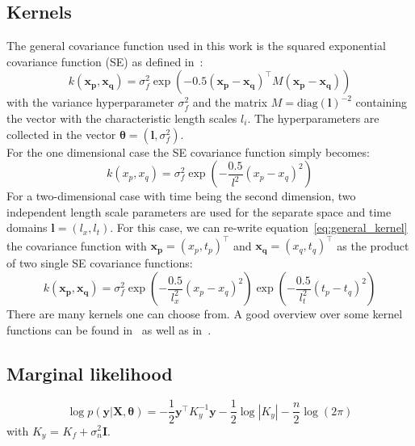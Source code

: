 \documentclass{article}
\begin{document}
\subsection{Kernels}
The general covariance function used in this work is the squared exponential covariance function (SE) as defined in~\cite{RasmussenCarlEdward}:
\begin{equation}
    k(\bm{x_p}, \bm{x_q}) = \sigma_f^2  \exp({-0.5{(\bm{x_p}-\bm{x_q} )}^\intercal M (\bm{x_p}- \bm{x_q})})
\end{equation}
with the variance hyperparameter $\sigma_f^2$ and the matrix $M = {\mathrm{diag}(\bm{l})}^{-2}$ containing the vector with the characteristic length scales $l_i$. The hyperparameters are collected in the vector $\bm{\theta} = (\bm{l},\sigma_f^2)$. \\
For the one dimensional case the SE covariance function simply becomes:
\begin{equation}
    k(x_p, x_q) = \sigma_f^2  \exp\left({-\frac{0.5}{l^2} {(x_p-x_q)}^2}\right)
\end{equation}
For a two-dimensional case with time being the second dimension, two independent length scale parameters are used for the separate space and time domains $\bm{l} = (l_x,l_t)$. For this case, we can re-write equation~\ref{eq:general_kernel} the covariance function with $\bm{x_p} = {(x_p, t_p)}^\intercal$ and  $\bm{x_q} = {(x_q, t_q)}^\intercal$ as the product of two single SE covariance functions:
\begin{equation}
    k(\bm{x_p}, \bm{x_q}) = \sigma_f^2  \exp\left({-\frac{0.5}{l_x^2} {(x_p-x_q)}^2}\right) \exp\left({-\frac{0.5}{l_t^2} {(t_p-t_q)}^2}\right)
\end{equation}
There are many kernels one can choose from. A good overview over some kernel functions can be found in~\cite{Duvenaud} as well as in~\cite{görtler2019a}. 
\subsection{Marginal likelihood}
\begin{equation}
    \log p(\bm{y}|\bm{X},\bm{\theta}) = -\frac{1}{2}\bm{y}^\intercal K_y^{-1}\bm{y} - \frac{1}{2}\log\left\lvert K_y\right\rvert - \frac{n}{2}\log(2\pi)
\end{equation}
with $K_y$ = $K_f + \sigma_n^2 \bm{I}$.
\end{document}

